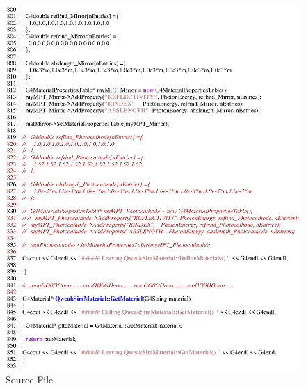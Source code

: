 \begin{figure}[h]
  \hspace{0cm}
  \includegraphics[scale=0.8]{./figures17/QweakSimMaterial.cc-p13.eps}
  \caption{\label{SourceXVII14} Source File}
           \label{fig:XVII-SC-14}
\end{figure}
\clearpage
